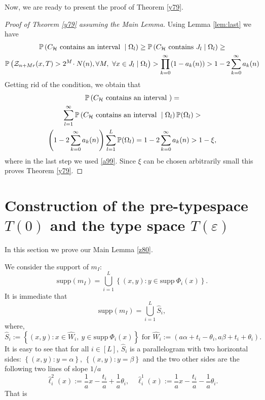 \documentclass[amssymb,amsfonts,12pt,verbatim,righttag,oneside]{amsart}
\numberwithin{equation}{section} %
\theoremstyle{plain}
\newcommand*{\pr}{\ensuremath{\mathbb{P}}}
\newcommand*{\Z}{\ensuremath{\mathcal{Z}}}
\newcommand*{\HH}{\ensuremath{T}}
\theoremstyle{plain}
\begin{document}
Now, we are ready to present the proof of Theorem \ref{y79}\label{page:end_of_proof}.

\begin{proof}[Proof of Theorem \ref{y79} assuming the Main Lemma]
Using Lemma \ref{lem:last} we have
\begin{multline*}
 \pr \left(C_{\mathcal{H}}\hbox{ contains an interval }\mid \Omega_l\right)\geq \pr \left(
 C_{\mathcal{H}} \hbox{ contains }J_l\mid \Omega_l\right)\geq
\\
\pr\left(\Z_{n+Mr}(x,\HH)>2^M\! \cdot N(n),\forall M,\ \forall x\in J_l\mid \Omega_l
\right)>\prod_{k=0}^\infty (1-a_k(n))>1-2\sum_{k=0}^\infty a_k(n)
\end{multline*}
Getting rid of the condition, we obtain that
\begin{multline*}
 \pr \left(C_{\mathcal{H}} \hbox{ contains an interval }\right)=
\\
\sum_{l=1}^\infty   \pr \left(C_{\mathcal{H}} \hbox{ contains an interval }\mid \Omega_l\right)\pr
(\Omega_l)>
\\
\left(1-2\sum_{k=0}^\infty a_k(n) \right)\sum_{l=1}^L\pr (\Omega_l)=1-2\sum_{k=0}^\infty
a_k(n)>1-\xi,
\end{multline*}
  {where in the last step we used \eqref{a99}.}
Since $\xi$ can be chosen arbitrarily small this proves Theorem \ref{y79}.

\end{proof}



\section{Construction of the pre-typespace $T(0)$ and the  type space $T(\varepsilon )$ }\label{y81}
In this section we prove our Main Lemma \ref{z80}.


We consider the support of $m_I$:
$$
\mathrm{supp}(m_I)=\bigcup\limits _{i=1}^{L}
\left\{ (x,y): y\in \mathrm{supp }\  \Phi _{i}(x)
  \right\}.
$$
It is immediate that
\begin{equation}
\label{z79}
\mathrm{supp}(m_I)=
\bigcup\limits _{i=1}^{L}
\widehat{S}_i,
\end{equation}
where,
$$
\widehat{S}_i:=
\left\{ (x,y):
x\in \widehat{W}_i,\
y\in \mathrm{supp}\ \Phi _i(x)
\right\} \text{ for }
\widehat{W}_i:=(a\alpha +t_i-\theta_i,a\beta  +t_i+\theta_i).
$$
It is easy to see that for all $i\in[L]$, $\widehat{S}_i$ is a parallelogram with two horizontal sides: $\left\{(x,y): y=\alpha  \right\}$, $\left\{(x,y): y=\beta  \right\}$
and the two other sides are the following two lines of slope $1/a$
$$
\widehat{\ell }_i^2(x):=\frac{1}{a}x-\frac{t_i}{a}+\frac{1}{a}\theta_i,\quad
\widehat{\ell }_i^1(x):=\frac{1}{a}x-\frac{t_i}{a}-\frac{1}{a}\theta_i.
$$
That is
\end{document}
